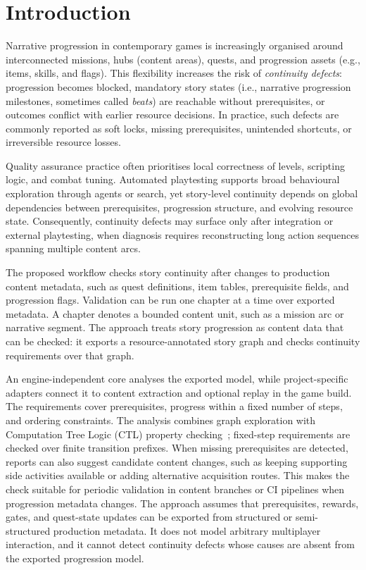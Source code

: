 \documentclass[conference]{IEEEtran}
\begin{document}

\section{Introduction}
\label{sec:intro}

Narrative progression in contemporary games is increasingly organised
around interconnected missions, hubs (content areas), quests, and progression assets
(e.g., items, skills, and flags). This flexibility increases the risk of
\emph{continuity defects}: progression becomes blocked, mandatory story
states (i.e., narrative progression milestones, sometimes called
\emph{beats}) are reachable without prerequisites, or outcomes conflict
with earlier resource decisions. In practice, such defects are commonly
reported as soft locks, missing prerequisites, unintended shortcuts, or
irreversible resource losses.

Quality assurance practice often prioritises local correctness of
levels, scripting logic, and combat tuning. Automated playtesting supports
broad behavioural exploration through agents or search, yet story-level
continuity depends on global dependencies between prerequisites,
progression structure, and evolving resource state. Consequently,
continuity defects may surface only after integration or external
playtesting, when diagnosis requires reconstructing long action sequences
spanning multiple content arcs.

The proposed workflow checks story continuity after changes to production
content metadata, such as quest definitions, item tables, prerequisite
fields, and progression flags. Validation can be run one chapter at a
time over exported metadata. A chapter denotes a bounded content unit,
such as a mission arc or narrative segment. The approach treats story
progression as content data that can be checked: it exports a
resource-annotated story graph and checks continuity requirements over
that graph.

An engine-independent core analyses the exported model, while
project-specific adapters connect it to content extraction and optional
replay in the game build. The requirements cover prerequisites, progress
within a fixed number of steps, and ordering constraints. The analysis
combines graph exploration with Computation Tree Logic (CTL) property
checking~\cite{Clarke2018ModelChecking2e}; fixed-step requirements are
checked over finite transition prefixes. When missing prerequisites are
detected, reports can also suggest candidate content changes, such as
keeping supporting side activities available or adding alternative
acquisition routes. This makes the check suitable for periodic validation
in content branches or CI pipelines when progression metadata changes. The approach assumes that prerequisites, rewards, gates, and quest-state
updates can be exported from structured or semi-structured production
metadata. It does not model arbitrary multiplayer interaction, and it
cannot detect continuity defects whose causes are absent from the
exported progression model.
\end{document}
